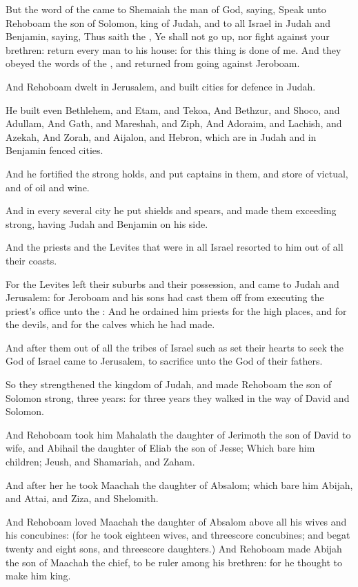 \verse But the word of the \LORD came to Shemaiah the man of God, saying, \verse Speak unto Rehoboam the son of Solomon, king of Judah, and to all Israel in Judah and Benjamin, saying, \verse Thus saith the \LORD, Ye shall not go up, nor fight against your brethren: return every man to his house: for this thing is done of me. And they obeyed the words of the \LORD, and returned from going against Jeroboam.

\verse And Rehoboam dwelt in Jerusalem, and built cities for defence in Judah.

\verse He built even Bethlehem, and Etam, and Tekoa, \verse And Bethzur, and Shoco, and Adullam, \verse And Gath, and Mareshah, and Ziph, \verse And Adoraim, and Lachish, and Azekah, \verse And Zorah, and Aijalon, and Hebron, which are in Judah and in Benjamin fenced cities.

\verse And he fortified the strong holds, and put captains in them, and store of victual, and of oil and wine.

\verse And in every several city he put shields and spears, and made them exceeding strong, having Judah and Benjamin on his side.

\verse And the priests and the Levites that were in all Israel resorted to him out of all their coasts.

\verse For the Levites left their suburbs and their possession, and came to Judah and Jerusalem: for Jeroboam and his sons had cast them off from executing the priest's office unto the \LORD: \verse And he ordained him priests for the high places, and for the devils, and for the calves which he had made.

\verse And after them out of all the tribes of Israel such as set their hearts to seek the \LORD God of Israel came to Jerusalem, to sacrifice unto the \LORD God of their fathers.

\verse So they strengthened the kingdom of Judah, and made Rehoboam the son of Solomon strong, three years: for three years they walked in the way of David and Solomon.

\verse And Rehoboam took him Mahalath the daughter of Jerimoth the son of David to wife, and Abihail the daughter of Eliab the son of Jesse; \verse Which bare him children; Jeush, and Shamariah, and Zaham.

\verse And after her he took Maachah the daughter of Absalom; which bare him Abijah, and Attai, and Ziza, and Shelomith.

\verse And Rehoboam loved Maachah the daughter of Absalom above all his wives and his concubines: (for he took eighteen wives, and threescore concubines; and begat twenty and eight sons, and threescore daughters.)  \verse And Rehoboam made Abijah the son of Maachah the chief, to be ruler among his brethren: for he thought to make him king.

